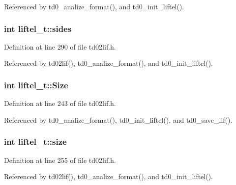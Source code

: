 Referenced by td0\+\_\+analize\+\_\+format(), and td0\+\_\+init\+\_\+liftel().

\subsubsection[{\texorpdfstring{sides}{sides}}]{\setlength{\rightskip}{0pt plus 5cm}int liftel\+\_\+t\+::sides}\hypertarget{structliftel__t_aabd804e27f6ab37de1ef9b890a0f1088}{}\label{structliftel__t_aabd804e27f6ab37de1ef9b890a0f1088}


Definition at line 290 of file td02lif.\+h.



Referenced by td02lif(), td0\+\_\+analize\+\_\+format(), and td0\+\_\+init\+\_\+liftel().

\subsubsection[{\texorpdfstring{Size}{Size}}]{\setlength{\rightskip}{0pt plus 5cm}int liftel\+\_\+t\+::\+Size}\hypertarget{structliftel__t_a9fe4b5bc923dd0ac989c7f0cacf19d30}{}\label{structliftel__t_a9fe4b5bc923dd0ac989c7f0cacf19d30}


Definition at line 243 of file td02lif.\+h.



Referenced by td0\+\_\+analize\+\_\+format(), td0\+\_\+init\+\_\+liftel(), and td0\+\_\+save\+\_\+lif().

\subsubsection[{\texorpdfstring{size}{size}}]{\setlength{\rightskip}{0pt plus 5cm}int liftel\+\_\+t\+::size}\hypertarget{structliftel__t_a7c0102997f04b216d2ec895495899b7f}{}\label{structliftel__t_a7c0102997f04b216d2ec895495899b7f}


Definition at line 255 of file td02lif.\+h.



Referenced by td02lif(), td0\+\_\+analize\+\_\+format(), and td0\+\_\+init\+\_\+liftel().

